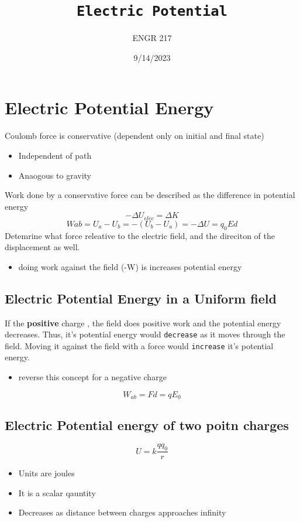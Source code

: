\documentclass[a4paper,12pt]{article}
\title{\texttt{Electric Potential}\\\hrulefill}
\author{ENGR 217}
\date{\small{9/14/2023}}
\begin{document}
    \maketitle

    \section{Electric Potential Energy} 
        Coulomb force is conservative (dependent only on initial and final state)
            \begin{itemize}
                \item Independent of path
                \item Anaogous to gravity
            \end{itemize}
            Work done by a conservative force can be described as the difference in potential energy
            \[-\Delta U_{elec}=\Delta K\]
            \[W{ab}=U_a-U_b=-(U_b-U_a)=-\Delta U=q_0Ed\]
            Detemrine what force releative to the electric field, and the direciton of the displacement as well.
            \begin{itemize}
                \item doing work against the field (-W) is increases potential energy
            \end{itemize}
            
        \subsection*{Electric Potential Energy in a Uniform field}
            If the \textbf{positive} charge , the field does positive work and the potential energy decreases. Thus, it's potential energy would \texttt{decrease} as it moves through the field. Moving it against the field with a force would \texttt{increase} it's potential energy.
                \begin{itemize}
                    \item reverse this concept for a negative charge
                \end{itemize}
            \[W_{ab}=Fd=qE_0\]

        \subsection*{Electric Potential energy of two poitn charges}
        \[U=k\frac{qq_0}{r}\]
        \begin{itemize}
            \item Units are joules
            \item It is a scalar qauntity
            \item Decreases as distance between charges approaches infinity
        \end{itemize}    
        
\end{document}
